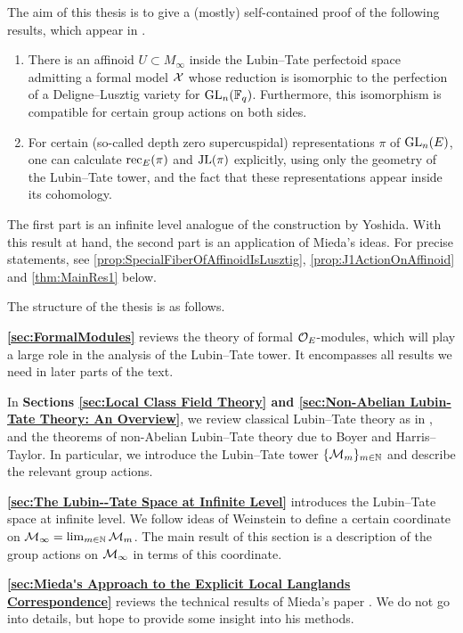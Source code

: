 \documentclass[../main.tex]{subfiles}
\begin{document}
The aim of this thesis is to give a (mostly) self-contained proof of
the following results, which appear in \cite[Section 5]{mieda2016geometric}. 
\begin{thm*}
  \leavevmode \begin{enumerate}
    \item There is an affinoid $U \subset M_\infty$ inside the Lubin--Tate perfectoid
      space admitting a formal model $\mathcal{X}$ whose reduction is isomorphic to the
      perfection of a Deligne--Lusztig variety for $\operatorname{GL}_n(\mathbb{F}_q)$. Furthermore,
      this isomorphism is compatible for certain group actions on both sides.
    \item For certain (so-called depth zero supercuspidal) representations
      $\pi$ of $\operatorname{GL}_n(E)$, one can calculate $\mathrm{rec}_E(\pi)$ and $\mathrm{JL}(\pi)$
      explicitly, using only the geometry of the Lubin--Tate tower, and the
      fact that these representations appear inside its cohomology.
  \end{enumerate}
\end{thm*}
The first part is an infinite level analogue of the construction by Yoshida.
With this result at hand, the second part is an application of Mieda's ideas.
For precise statements, see \cref{prop:SpecialFiberOfAffinoidIsLusztig},
\cref{prop:J1ActionOnAffinoid} and \cref{thm:MainRes1} below. 

The structure of the thesis is as follows.

\textbf{\cref{sec:FormalModules}} reviews the theory of formal $\mathcal{O}_E$-modules, which
will play a large role in the analysis of the Lubin--Tate tower. It encompasses
all results we need in later parts of the text.

In \textbf{Sections \ref{sec:Local Class Field Theory}  and \ref{sec:Non-Abelian Lubin-Tate Theory: An Overview}}, we review classical Lubin--Tate theory as in
\cite{LubinTateFormalMult}, and the theorems of non-Abelian Lubin--Tate theory
due to Boyer and Harris--Taylor. In particular,
we introduce the Lubin--Tate tower $\{\mathcal{M}_m\}_{m \in \mathbb{N}}$ and describe the
relevant group actions.

\textbf{\cref{sec:The Lubin--Tate Space at Infinite Level}} introduces the
Lubin--Tate space at infinite level. 
We follow ideas of Weinstein to define a certain coordinate on $\mathcal{M}_\infty = 
\lim_{m \in \mathbb{N}} \mathcal{M}_m$. The main result of this section is a description of
the group actions on $\mathcal{M}_\infty$ in terms of this coordinate. 

\textbf{\cref{sec:Mieda's Approach to the Explicit Local Langlands
Correspondence}} reviews the technical results of Mieda's paper
\cite{mieda2016geometric}. We do not go into details, but hope to provide some
insight into his methods. 
\end{document}
